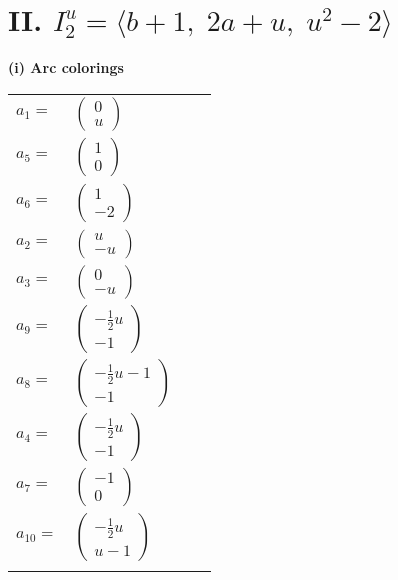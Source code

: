 \documentclass[1p]{elsarticle_modified}
\theoremstyle{definition}
\begin{document}
\centering \section*{II. $I^u_{2}= \langle b+1,\;2 a+u,\;u^2-2 \rangle$}
\flushleft \textbf{(i) Arc colorings}\\
\begin{tabular}{m{7pt} m{180pt} m{7pt} m{180pt} }
\flushright $a_{1}=$&$\begin{pmatrix}0\\u\end{pmatrix}$ \\
\flushright $a_{5}=$&$\begin{pmatrix}1\\0\end{pmatrix}$ \\
\flushright $a_{6}=$&$\begin{pmatrix}1\\-2\end{pmatrix}$ \\
\flushright $a_{2}=$&$\begin{pmatrix}u\\- u\end{pmatrix}$ \\
\flushright $a_{3}=$&$\begin{pmatrix}0\\- u\end{pmatrix}$ \\
\flushright $a_{9}=$&$\begin{pmatrix}-\frac{1}{2} u\\-1\end{pmatrix}$ \\
\flushright $a_{8}=$&$\begin{pmatrix}-\frac{1}{2} u-1\\-1\end{pmatrix}$ \\
\flushright $a_{4}=$&$\begin{pmatrix}-\frac{1}{2} u\\-1\end{pmatrix}$ \\
\flushright $a_{7}=$&$\begin{pmatrix}-1\\0\end{pmatrix}$ \\
\flushright $a_{10}=$&$\begin{pmatrix}-\frac{1}{2} u\\u-1\end{pmatrix}$\\&\end{tabular}
\end{document}
